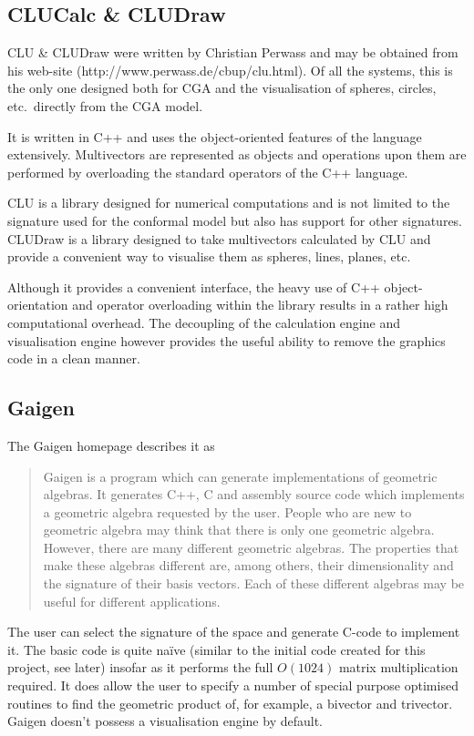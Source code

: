 \subsection{CLUCalc \& CLUDraw}


CLU \& CLUDraw were written by Christian Perwass and may be obtained from his
web-site (http://www.perwass.de/cbup/clu.html). Of all the systems, this
is the only one designed both for CGA and the visualisation of spheres,
circles, etc.\ directly from the CGA model.

It is written in C++ and uses the object-oriented features of the language
extensively. Multivectors are represented as objects and operations upon
them are performed by overloading the standard operators of the C++
language. 

CLU is a library designed for numerical computations and is not limited
to the signature used for the conformal model but also has support for
other signatures. CLUDraw is a library designed to take multivectors calculated
by CLU and provide a convenient way to visualise them as spheres, lines, planes,
etc. 

Although it provides a convenient interface, the heavy use of C++ object-orientation
and operator overloading within the library results in a rather high
computational overhead. The decoupling of the calculation engine and
visualisation engine however provides the useful ability to remove the
graphics code in a clean manner.


%

\subsection{Gaigen}

The Gaigen 
homepage\cite{Gaigen} describes 
it as
\begin{quote}
Gaigen is a program which can generate implementations of geometric algebras. It generates C++, C and assembly source code which implements a geometric algebra requested by the user. People who are new to geometric algebra may think that there is only one geometric algebra. However, there are many different geometric algebras. The properties that make these algebras different are, among others, their dimensionality and the signature of their basis vectors. Each of these different algebras may be useful for different applications.
\end{quote}
The user can select the signature of the space and generate C-code to implement it. The
basic code is quite na\"ive (similar to the initial code created for
this project, see later) insofar as it
performs the full $O(1024)$ matrix multiplication required. It does allow the
user to specify a number of special purpose optimised routines to
find the geometric product of, for example, a bivector and trivector.
Gaigen doesn't possess a visualisation engine by default.


